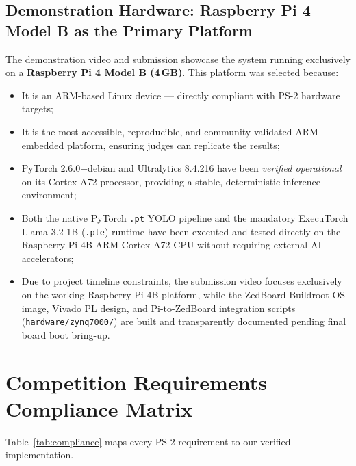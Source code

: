 \documentclass[12pt,a4paper]{article}
\begin{document}
\subsection{Demonstration Hardware: Raspberry Pi 4 Model B as the Primary Platform}

\begin{reqbox}
The demonstration video and submission showcase the system running exclusively on a
\textbf{Raspberry Pi 4 Model B (4\,GB)}. This platform was selected because:
\begin{itemize}
  \item It is an ARM-based Linux device --- directly compliant with PS-2 hardware targets;
  \item It is the most accessible, reproducible, and community-validated ARM embedded
        platform, ensuring judges can replicate the results;
  \item PyTorch 2.6.0+debian and Ultralytics 8.4.216 have been \textit{verified operational}
        on its Cortex-A72 processor, providing a stable, deterministic inference environment;
  \item Both the native PyTorch \texttt{.pt} YOLO pipeline and the mandatory ExecuTorch
        Llama 3.2 1B (\texttt{.pte}) runtime have been executed and tested directly on the
        Raspberry Pi 4B ARM Cortex-A72 CPU without requiring external AI accelerators;
  \item Due to project timeline constraints, the submission video focuses exclusively on
        the working Raspberry Pi 4B platform, while the ZedBoard Buildroot OS image, Vivado
        PL design, and Pi-to-ZedBoard integration scripts (\texttt{hardware/zynq7000/}) are
        built and transparently documented pending final board boot bring-up.
\end{itemize}
\end{reqbox}

\clearpage

\section{Competition Requirements Compliance Matrix}

Table~\ref{tab:compliance} maps every PS-2 requirement to our verified implementation.
\end{document}
